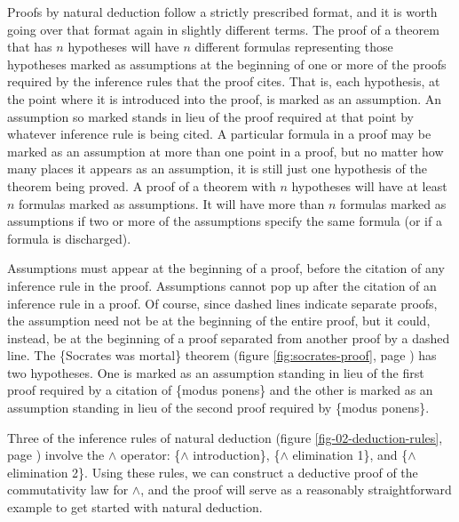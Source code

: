 Proofs by natural deduction follow a strictly prescribed format,
and it is worth going over that format again in slightly different terms.
The proof of a theorem that has
$n$ hypotheses will have $n$ different
formulas representing those hypotheses
marked as assumptions
at the beginning of one or more of the proofs
required by the inference rules that the proof cites.
That is, each hypothesis, at the point where it is introduced
into the proof, is marked as an assumption.
An assumption so marked stands in lieu of the proof
required at that point by whatever inference rule is being cited.
A particular formula in a proof may be marked as an assumption
at more than one point in a proof, but no matter how many places
it appears as an assumption, it is still just
one hypothesis of the theorem being proved.
A proof of a theorem with $n$ hypotheses will have at least $n$
formulas marked as assumptions.
It will have more than $n$ formulas marked as assumptions
if two or more of the assumptions specify the same formula
(or if a formula is discharged).

Assumptions must appear at the beginning of
a proof, before the citation of any
inference rule in the proof.
Assumptions cannot pop up after the citation
of an inference rule in a proof.
Of course, since dashed
lines indicate separate proofs,
the assumption need not be at the beginning of the entire
proof, but it could, instead, be at the beginning of
a proof separated from another proof by a dashed line.
The \{Socrates was mortal\} theorem
(figure \ref{fig:socrates-proof}, page \pageref{fig:socrates-proof})
has two hypotheses.
One is marked as an assumption standing in lieu of the first proof
required by a citation of \{modus ponens\}
and the other is marked as an assumption
standing in lieu of the second proof
required by \{modus ponens\}.

Three of the inference rules of natural deduction
(figure \ref{fig-02-deduction-rules}, page \pageref{fig-02-deduction-rules})
involve the $\wedge$ operator:
\{$\wedge$ introduction\},
\{$\wedge$ elimination 1\}, and
\{$\wedge$ elimination 2\}.
Using these rules, we can construct a deductive proof
of the commutativity law for $\wedge$,
and the proof will serve as a reasonably straightforward
example to get started with natural deduction.

